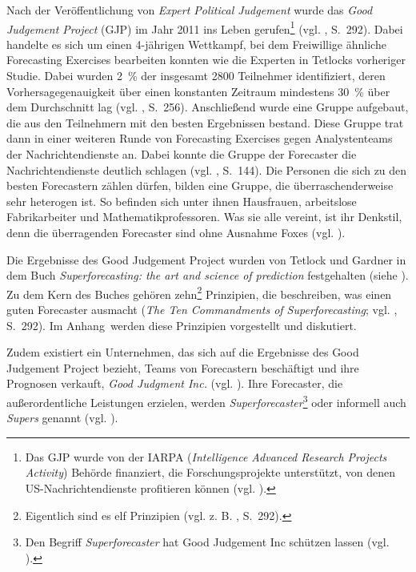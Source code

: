 Nach der Veröffentlichung von \emph{Expert Political Judgement} wurde das
\emph{Good Judgement Project} (GJP) im Jahr 2011 ins Leben gerufen\footnote{
Das GJP wurde von der IARPA (\emph{Intelligence Advanced Research Projects
Activity}) Behörde finanziert, die Forschungsprojekte
unterstützt, von denen US-Nachrichtendienste profitieren können (vgl. \cite{Burton}).
} (vgl. \cite{Jackson}, S.~292). Dabei handelte es sich um einen 4-jährigen Wettkampf, bei dem
Freiwillige ähnliche Forecasting Exercises bearbeiten konnten wie die Experten
in Tetlocks vorheriger Studie. Dabei wurden 2~\% der insgesamt 2800 Teilnehmer identifiziert, 
deren Vorhersagegenauigkeit über einen konstanten Zeitraum
mindestens 30~\%  über dem Durchschnitt lag (vgl. \cite{Roetheli}, S.~256). Anschließend wurde eine Gruppe
aufgebaut, die aus den Teilnehmern mit den besten Ergebnissen bestand. Diese
Gruppe trat dann in einer weiteren Runde von Forecasting Exercises gegen
Analystenteams der Nachrichtendienste an. Dabei konnte die Gruppe der Forecaster
die Nachrichtendienste deutlich schlagen (vgl. \cite{Roche}, S.~144). Die Personen
die sich zu den besten Forecastern zählen dürfen, bilden eine Gruppe, die überraschenderweise sehr heterogen ist.
So befinden sich unter ihnen Hausfrauen, arbeitslose
Fabrikarbeiter und Mathematikprofessoren. Was sie alle vereint, ist ihr Denkstil,
denn die überragenden Forecaster sind ohne Ausnahme Foxes (vgl. \cite{Economist}).

Die Ergebnisse des Good Judgement Project wurden von Tetlock und Gardner
in dem Buch \emph{Superforecasting: the art and science of prediction} festgehalten (siehe \cite{Super}).
Zu dem Kern des Buches gehören zehn\footnote{Eigentlich sind es elf Prinzipien (vgl. z. B. \cite{Jackson}, S.~292).}
Prinzipien, die beschreiben, was einen guten Forecaster ausmacht (\emph{The Ten Commandments of Superforecasting};
vgl. \cite{Jackson}, S.~292). Im Anhang~\xcom werden diese Prinzipien vorgestellt und diskutiert.

Zudem existiert ein Unternehmen, das sich auf die Ergebnisse des Good Judgement Project bezieht,
Teams von Forecastern beschäftigt und ihre Prognosen verkauft, \emph{Good Judgment Inc.} (vgl. \cite{GJP_Ink}).
Ihre Forecaster, die außerordentliche Leistungen erzielen, werden \emph{Superforecaster}\footnote{
Den Begriff \emph{Superforecaster} hat Good Judgement Inc schützen lassen (vgl. \cite{Super}).
} oder informell auch \emph{Supers} genannt (vgl. \cite{Burton}).


